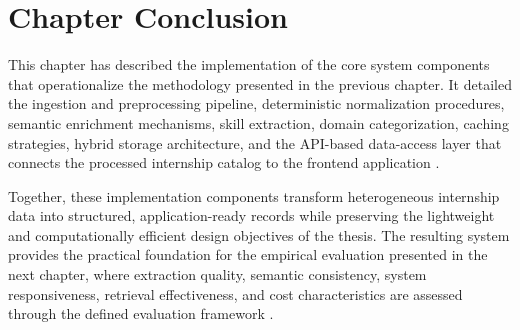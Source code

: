 \section{Chapter Conclusion}

This chapter has described the implementation of the core system components that operationalize the methodology presented in the previous chapter. It detailed the ingestion and preprocessing pipeline, deterministic normalization procedures, semantic enrichment mechanisms, skill extraction, domain categorization, caching strategies, hybrid storage architecture, and the API-based data-access layer that connects the processed internship catalog to the frontend application \cite{peffers2007design, bass2012software}.

Together, these implementation components transform heterogeneous internship data into structured, application-ready records while preserving the lightweight and computationally efficient design objectives of the thesis. The resulting system provides the practical foundation for the empirical evaluation presented in the next chapter, where extraction quality, semantic consistency, system responsiveness, retrieval effectiveness, and cost characteristics are assessed through the defined evaluation framework \cite{schwartz2020green, menghani2023efficient, wohlin2012experimentation}.
